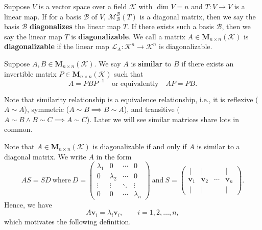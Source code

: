 \documentclass{ctexart}
\begin{document}
	\begin{mydef}
		Suppose $V$ is a vector space over a field $\mathcal{K}$ with $\dim V = n$ and $T:V\to V$ is a linear map. If for a basis $\mathcal{B}$ of $V$, $\mathcal{M}_\mathcal{B}^\mathcal{B}(T)$ is a diagonal matrix, then we say the basis $\mathcal{B}$ \textbf{diagonalizes} the linear map $T$. If there exists such a basis $\mathcal{B}$, then we say the linear map $T$ is \textbf{diagonalizable}. We call a matrix $A \in \mathbf{M}_{n \times n}(\mathcal{K})$ is \textbf{diagonalizable} if the linear map $\mathcal{L}_A: \mathcal{K}^n \to \mathcal{K}^n$ is diagonalizable.
	\end{mydef}
	\begin{mydef}
		Suppose $A,B\in \mathbf{M}_{n \times n}(\mathcal{K})$. We say $A$ is \textbf{similar} to $B$ if there exists an invertible matrix $P \in \mathbf{M}_{n \times n}(\mathcal{K})$ such that
		\[
		A = P B P^{-1}\quad\text{or equivalently}\quad AP=PB.
		\]
	\end{mydef}
	\begin{myrmk}
		Note that similarity relationship is a equivalence relationship, i.e., it is reflexive ($A \sim A$), symmetric ($A \sim B \implies B \sim A$), and transitive ($A \sim B \wedge B \sim C \implies A \sim C$). Later we will see similar matrices share lots in common.
	\end{myrmk}
	\begin{mypro}
		Note that $A \in \mathbf{M}_{n\times n}(\mathcal{K})$ is diagonalizable if and only if $A$ is similar to a diagonal matrix. We write $A$ in the form
		\[
		AS = SD
		\ \text{where}\ 
		D =
		\begin{pmatrix}
		\lambda_1 & 0        & \cdots & 0 \\
		0         & \lambda_2& \cdots & 0 \\
		\vdots    & \vdots   & \ddots & \vdots \\
		0         & 0        & \cdots & \lambda_n
		\end{pmatrix}
		\ \text{and}\ 
		S =
		\begin{pmatrix}
		\,|      & |      &        & |\, \\
		\mathbf{v}_1 & \mathbf{v}_2 & \cdots & \mathbf{v}_n \\
		\,|      & |      &        & |\,
		\end{pmatrix}.
		\]
		Hence, we have
		\[
		A\mathbf{v}_i = \lambda_i \mathbf{v}_i, \qquad i = 1,2,\ldots,n,
		\]
		which motivates the following definition.
	\end{mypro}
\end{document}
